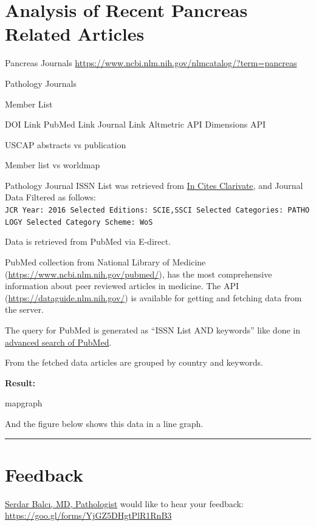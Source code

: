 \documentclass[
]{book}
\begin{document}
\hypertarget{analysis-of-recent-pancreas-related-articles}{%
\chapter{Analysis of Recent Pancreas Related Articles}\label{analysis-of-recent-pancreas-related-articles}}

Pancreas Journals
\url{https://www.ncbi.nlm.nih.gov/nlmcatalog/?term=pancreas}

Pathology Journals

Member List

DOI Link
PubMed Link
Journal Link
Altmetric API
Dimensions API

USCAP abstracts vs publication

Member list vs worldmap

Pathology Journal ISSN List was retrieved from \href{https://jcr.incites.thomsonreuters.com/}{In Cites Clarivate}, and Journal Data Filtered as follows: \texttt{JCR\ Year:\ 2016\ Selected\ Editions:\ SCIE,SSCI\ Selected\ Categories:\ \textquotesingle{}PATHOLOGY\textquotesingle{}\ Selected\ Category\ Scheme:\ WoS}

Data is retrieved from PubMed via E-direct.

PubMed collection from National Library of Medicine (\url{https://www.ncbi.nlm.nih.gov/pubmed/}), has the most comprehensive information about peer reviewed articles in medicine.
The API (\url{https://dataguide.nlm.nih.gov/}) is available for getting and fetching data from the server.

The query for PubMed is generated as ``ISSN List AND keywords'' like done in \href{https://www.ncbi.nlm.nih.gov/pubmed/advanced}{advanced search of PubMed}.

From the fetched data articles are grouped by country and keywords.

\textbf{Result:}

mapgraph

And the figure below shows this data in a line graph.

\begin{center}\rule{0.5\linewidth}{0.5pt}\end{center}

\hypertarget{feedback}{%
\chapter{Feedback}\label{feedback}}

\href{https://github.com/sbalci}{Serdar Balcı, MD, Pathologist} would like to hear your feedback: \url{https://goo.gl/forms/YjGZ5DHgtPlR1RnB3}
\end{document}
